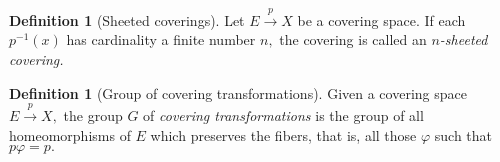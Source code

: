 \documentclass[12pt]{article}
\theoremstyle{definition}
\numberwithin{thm}{section}
\newtheorem{defn}[thm]{Definition}
\begin{document}
\begin{defn}[Sheeted coverings]
	Let $E \overset{p}{\longrightarrow} X$ be a covering space. If each $p^{-1}(x)$ has cardinality a finite number $n,$ the covering is called an \emph{$n$-sheeted covering.}
\end{defn}

\begin{defn}[Group of covering transformations]
	Given a covering space $E \overset{p}{\longrightarrow} X,$ the group $G$ of \emph{covering transformations} is the group of all homeomorphisms of $E$ which preserves the fibers, that is, all those $\varphi$ such that $p\varphi = p.$

	\begin{center}
	\end{center}
\end{defn}
\end{document}
